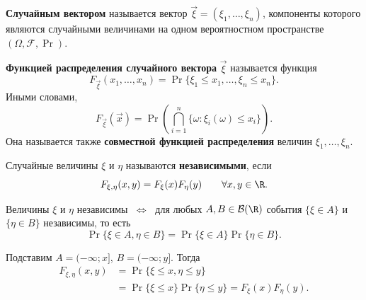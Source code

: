
\begin{definition}
    \textbf{Случайным вектором} называется вектор
    $\vec\xi=(\xi_1,\ldots,\xi_n)$, компоненты которого являются
    случайными величинами на одном вероятностном пространстве
    $(\Omega,\mathcal F,\Pr)$.
\end{definition}

\begin{definition}
    \textbf{Функцией распределения случайного вектора} $\vec\xi$
    называется функция
    \[
        F_{\vec\xi}(x_1,\ldots,x_n)
        =\Pr\{\xi_1\leq x_1,\ldots,\xi_n\leq x_n\}.
    \]
    Иными словами,
    \[
        F_{\vec\xi}(\vec x)
        =\Pr\left(\bigcap_{i=1}^{n}\{\omega:\xi_i(\omega)\leq x_i\}\right).
    \]
    Она называется также \textbf{совместной функцией распределения}
    величин $\xi_1,\ldots,\xi_n$.
\end{definition}

\begin{definition}
    Случайные величины $\xi$ и $\eta$ называются \textbf{независимыми}, если
    \[
        F_{\xi,\eta}(x,y)=F_\xi(x)F_\eta(y)
        \qquad\forall x,y\in\R.
    \]
\end{definition}

\begin{theorem}
    Величины $\xi$ и $\eta$ независимы $\;\Leftrightarrow\;$
    для любых $A,B\in\mathcal B(\R)$ события $\{\xi\in A\}$ и $\{\eta\in B\}$
    независимы, то есть
    \[
        \Pr\{\xi\in A,\eta\in B\}
        =\Pr\{\xi\in A\}\Pr\{\eta\in B\}.
    \]
\end{theorem}

\begin{Proof}
    Подставим $A=(-\infty;x]$, $B=(-\infty;y]$. Тогда
    \[
        \begin{aligned}
            F_{\xi,\eta}(x,y)
            &=\Pr\{\xi\leq x,\eta\leq y\}\\
            &=\Pr\{\xi\leq x\}\Pr\{\eta\leq y\}
             =F_\xi(x)F_\eta(y).
        \end{aligned}
    \]
\end{Proof}

